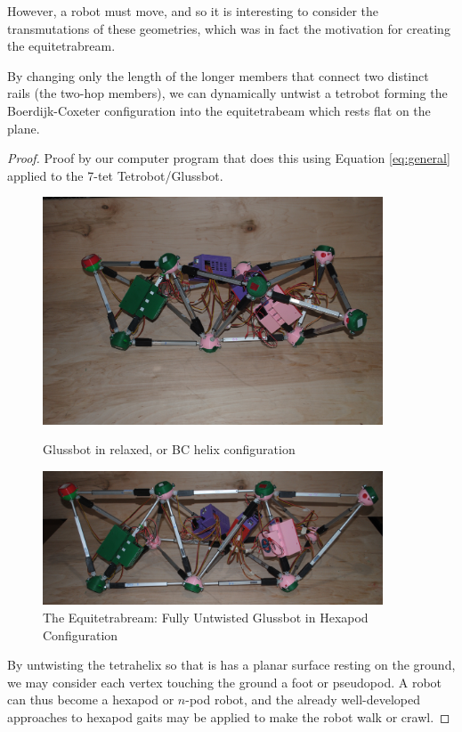 \documentclass[review]{siamonline1116}
\begin{document}
However, a robot must move, and so it is interesting to consider the
transmutations of these geometries, which was in fact the motivation
for creating the equitetrabream.

\begin{theorem}
  By changing only the length of the longer members that connect two distinct rails (the two-hop members), we can dynamically untwist a tetrobot
  forming the Boerdijk-Coxeter configuration into the equitetrabeam which rests flat on the plane.
\end{theorem}

\begin{proof}
  Proof by our computer program that does this using Equation \eqref{eq:general} applied to the
  7-tet Tetrobot/Glussbot.

\begin{figure}[H] %
  \centering
     \includegraphics[width=0.9\textwidth]{figures/GlussBotBC.jpg}
     \caption{Glussbot in relaxed, or BC helix configuration}
     \includegraphics[width=0.9\textwidth]{figures/GlussBotEquitetrabeamCropped.jpg}
     \caption{The Equitetrabream: Fully Untwisted Glussbot in Hexapod Configuration}
     \label{fig:glussbot}
\end{figure}

By untwisting the tetrahelix so that is has a planar surface resting on the ground,
we may consider each vertex touching the ground a foot or pseudopod. A robot can thus
become a hexapod or $n$-pod robot, and the already well-developed approaches to
hexapod gaits may be applied to make the robot walk or crawl.

\end{proof}
\end{document}
